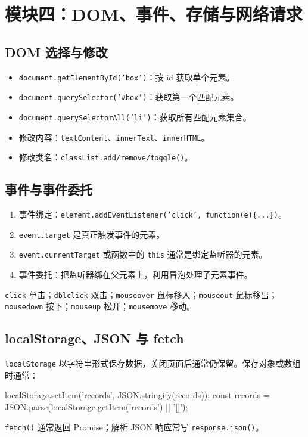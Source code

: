 \documentclass[UTF8,zihao=-4]{ctexart}
\begin{document}
\section{模块四：DOM、事件、存储与网络请求}

\subsection{DOM 选择与修改}
\begin{keybox}[DOM 方法]
\begin{itemize}
  \item \texttt{document.getElementById('box')}：按 id 获取单个元素。
  \item \texttt{document.querySelector('\#box')}：获取第一个匹配元素。
  \item \texttt{document.querySelectorAll('li')}：获取所有匹配元素集合。
  \item 修改内容：\texttt{textContent}、\texttt{innerText}、\texttt{innerHTML}。
  \item 修改类名：\texttt{classList.add/remove/toggle()}。
\end{itemize}
\end{keybox}

\subsection{事件与事件委托}
\begin{methodbox}[事件题模板]
\begin{enumerate}
  \item 事件绑定：\texttt{element.addEventListener('click', function(e)\{...\})}。
  \item \texttt{event.target} 是真正触发事件的元素。
  \item \texttt{event.currentTarget} 或函数中的 \texttt{this} 通常是绑定监听器的元素。
  \item 事件委托：把监听器绑在父元素上，利用冒泡处理子元素事件。
\end{enumerate}
\end{methodbox}

\begin{keybox}[常见鼠标事件]
\texttt{click} 单击；\texttt{dblclick} 双击；\texttt{mouseover} 鼠标移入；\texttt{mouseout} 鼠标移出；\texttt{mousedown} 按下；\texttt{mouseup} 松开；\texttt{mousemove} 移动。
\end{keybox}

\subsection{localStorage、JSON 与 fetch}
\begin{keybox}[本地存储]
\texttt{localStorage} 以字符串形式保存数据，关闭页面后通常仍保留。保存对象或数组时通常：
\begin{Code}
localStorage.setItem('records', JSON.stringify(records));
const records = JSON.parse(localStorage.getItem('records') || '[]');
\end{Code}
\texttt{fetch()} 通常返回 Promise；解析 JSON 响应常写 \texttt{response.json()}。
\end{keybox}
\end{document}
